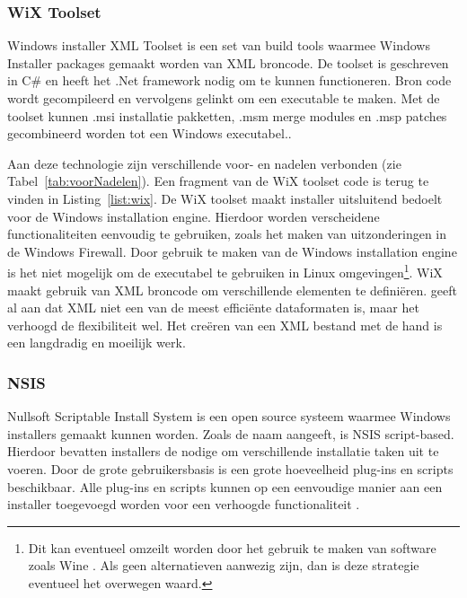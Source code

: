 \subsubsection{WiX Toolset}
Windows installer XML Toolset is een set van build tools waarmee Windows Installer packages gemaakt worden van XML broncode.
De toolset is geschreven in C\# en heeft het .Net framework nodig om te kunnen functioneren.
Bron code wordt gecompileerd en vervolgens gelinkt om een executable te maken.
Met de toolset kunnen .msi installatie pakketten, .msm merge modules en .msp patches gecombineerd worden tot een Windows executabel.\citep{wixToolset}.

Aan deze technologie zijn verschillende voor- en nadelen verbonden (zie Tabel~\ref{tab:voorNadelen}).
Een fragment van de WiX toolset code is terug te vinden in Listing~\vref{list:wix}.
De WiX toolset maakt installer uitsluitend bedoelt voor de Windows installation engine.
Hierdoor worden verscheidene functionaliteiten eenvoudig te gebruiken, zoals het maken van uitzonderingen in de Windows Firewall.
Door gebruik te maken van de Windows installation engine is het niet mogelijk om de executabel te gebruiken in Linux omgevingen\footnote{Dit kan eventueel omzeilt worden door het gebruik te maken van software zoals Wine \citep{amstadt1994wine}. Als geen alternatieven aanwezig zijn, dan is deze strategie eventueel het overwegen waard.}.
WiX maakt gebruik van XML broncode om verschillende elementen te definiëren.
\citet{xmill} geeft al aan dat XML niet een van de meest efficiënte dataformaten is, maar het verhoogd de flexibiliteit wel.
Het creëren van een XML bestand met de hand is een langdradig en moeilijk werk.

\subsubsection{NSIS}
Nullsoft Scriptable Install System is een open source systeem waarmee Windows installers gemaakt kunnen worden.
Zoals de naam aangeeft, is NSIS script-based.
Hierdoor bevatten installers de nodige om verschillende installatie taken uit te voeren.
Door de grote gebruikersbasis is een grote hoeveelheid plug-ins en scripts beschikbaar.
Alle plug-ins en scripts kunnen op een eenvoudige manier aan een installer toegevoegd worden voor een verhoogde functionaliteit \citep{nsisMain}.

